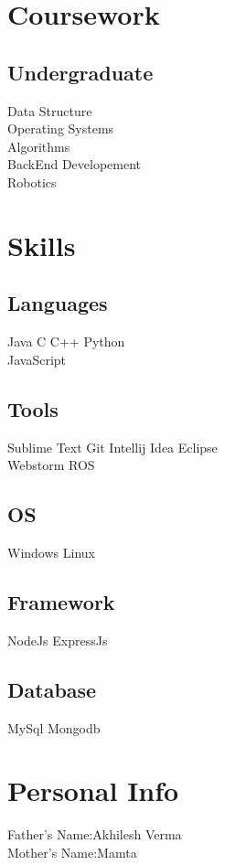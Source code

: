 \documentclass[]{resume}
\begin{document}
\begin{minipage}[t]{0.33\textwidth}

\section{Coursework}

\subsection{Undergraduate}
Data Structure\\
Operating Systems \\
Algorithms \\
BackEnd Developement \\
Robotics \\
\sectionsep


\section{Skills}
\subsection{Languages}
Java \textbullet{}   C \textbullet{} C++ \textbullet{} Python \\
JavaScript
\subsection{Tools}
Sublime Text \textbullet{} Git \textbullet{} Intellij Idea \textbullet{} Eclipse  \\
Webstorm \textbullet{} ROS
\subsection{OS}
Windows \textbullet{} Linux
\subsection{Framework}
NodeJs \textbullet{} ExpressJs 
\subsection{Database}
MySql \textbullet{} Mongodb 
\sectionsep

\section{Personal Info}
Father's Name:Akhilesh Verma\\
Mother's Name:Mamta\\

%
%

\end{minipage} 
\end{document}
